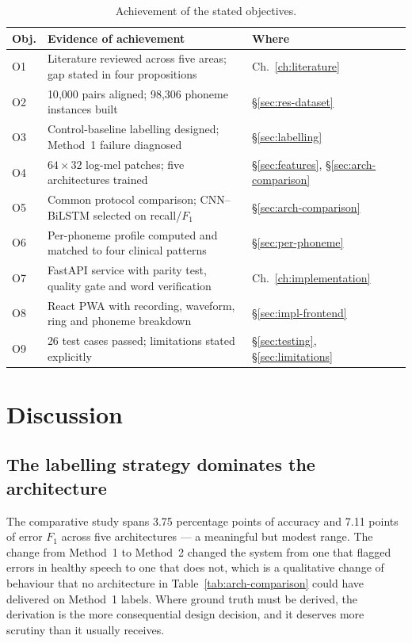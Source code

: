 \begin{table}[H]
\centering
\caption[Achievement of objectives]{Achievement of the stated objectives.}
\label{tab:objectives}
\small
\begin{tabularx}{\textwidth}{@{}p{0.8cm}Xp{2.6cm}@{}}
\toprule
\textbf{Obj.} & \textbf{Evidence of achievement} & \textbf{Where} \\
\midrule
O1 & Literature reviewed across five areas; gap stated in four propositions & Ch.~\ref{ch:literature} \\
O2 & 10{,}000 pairs aligned; 98{,}306 phoneme instances built & \S\ref{sec:res-dataset} \\
O3 & Control-baseline labelling designed; Method~1 failure diagnosed & \S\ref{sec:labelling} \\
O4 & $64\times32$ log-mel patches; five architectures trained & \S\ref{sec:features}, \S\ref{sec:arch-comparison} \\
O5 & Common protocol comparison; CNN--BiLSTM selected on recall/$F_1$ & \S\ref{sec:arch-comparison} \\
O6 & Per-phoneme profile computed and matched to four clinical patterns & \S\ref{sec:per-phoneme} \\
O7 & FastAPI service with parity test, quality gate and word verification & Ch.~\ref{ch:implementation} \\
O8 & React PWA with recording, waveform, ring and phoneme breakdown & \S\ref{sec:impl-frontend} \\
O9 & 26 test cases passed; limitations stated explicitly & \S\ref{sec:testing}, \S\ref{sec:limitations} \\
\bottomrule
\end{tabularx}
\end{table}

\section{Discussion}
\label{sec:discussion}

\subsection{The labelling strategy dominates the architecture}

The comparative study spans 3.75 percentage points of accuracy and 7.11 points
of error $F_1$ across five architectures --- a meaningful but modest range. The
change from Method~1 to Method~2 changed the system from one that flagged errors
in healthy speech to one that does not, which is a qualitative change of
behaviour that no architecture in Table~\ref{tab:arch-comparison} could have
delivered on Method~1 labels. Where ground truth must be derived, the derivation
is the more consequential design decision, and it deserves more scrutiny than it
usually receives.

